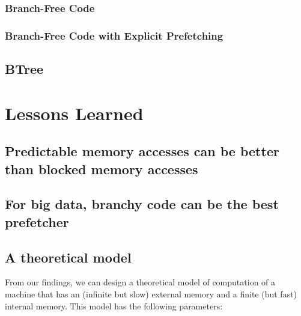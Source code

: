 \documentclass{patmorin}
\begin{document}
\subsubsection{Branch-Free Code}

\subsubsection{Branch-Free Code with Explicit Prefetching}

\subsection{BTree}





\section{Lessons Learned}

\subsection{Predictable memory accesses can be better than blocked
            memory accesses}

\subsection{For big data, branchy code can be the best prefetcher}

\subsection{A theoretical model}

From our findings, we can design a theoretical model of computation of
a machine that has an (infinite but slow) external memory and a finite
(but fast) internal memory.  This model has the following parameters:
\end{document}
